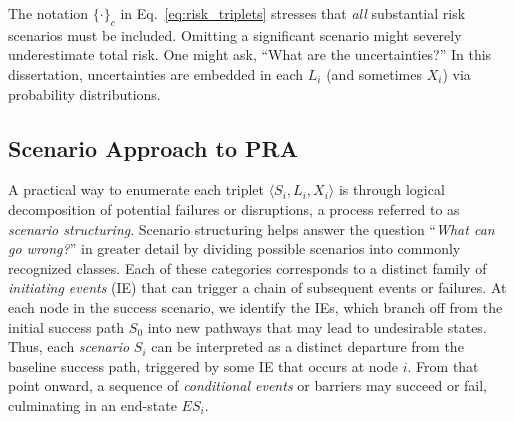 The notation \(\{\cdot\}_{c}\) in Eq.~\eqref{eq:risk_triplets} stresses that \emph{all} substantial risk scenarios must be included. Omitting a significant scenario might severely underestimate total risk. One might ask, ``What are the uncertainties?'' In this dissertation, uncertainties are embedded in each \(L_i\) (and sometimes \(X_i\)) via probability distributions.

\subsection{Scenario Approach to PRA}
\label{sec:scenario_approach_to_pra}

A practical way to enumerate each triplet \(\langle S_i, L_i, X_i\rangle\) is through logical decomposition of potential failures or disruptions, a process referred to as \emph{scenario structuring}. Scenario structuring helps answer the question ``\textit{What can go wrong?}'' in greater detail by dividing possible scenarios into commonly recognized classes. Each of these categories corresponds to a distinct family of \emph{initiating events} (IE) that can trigger a chain of subsequent events or failures. At each node in the success scenario, we identify the IEs, which branch off from the initial success path \(S_0\) into new pathways that may lead to undesirable states. Thus, each \emph{scenario} \(S_i\) can be interpreted as a distinct departure from the baseline success path, triggered by some IE that occurs at node \(i\). From that point onward, a sequence of \emph{conditional events} or barriers may succeed or fail, culminating in an end-state \(ES_i\).
